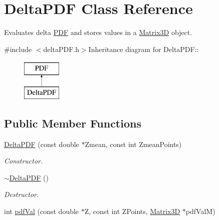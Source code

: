 \hypertarget{classDeltaPDF}{
\section{DeltaPDF Class Reference}
\label{dd/d98/classDeltaPDF}
}


Evaluates delta \hyperlink{classPDF}{PDF} and stores values in a \hyperlink{classMatrix3D}{Matrix3D} object.  


{\ttfamily \#include $<$deltaPDF.h$>$}Inheritance diagram for DeltaPDF::\begin{figure}[H]
\begin{center}
\leavevmode
\includegraphics[height=2cm]{dd/d98/classDeltaPDF}
\end{center}
\end{figure}
\subsection*{Public Member Functions}
\begin{DoxyCompactItemize}
\item 
\hypertarget{classDeltaPDF_a6268a222dac459788d7a7589e0bec1c5}{
\hyperlink{classDeltaPDF_a6268a222dac459788d7a7589e0bec1c5}{DeltaPDF} (const double $\ast$Zmean, const int ZmeanPoints)}
\label{dd/d98/classDeltaPDF_a6268a222dac459788d7a7589e0bec1c5}

\begin{DoxyCompactList}\small\item\em Constructor. \item\end{DoxyCompactList}\item 
\hypertarget{classDeltaPDF_a9539ed9f2f24966af76b6bba4734b2be}{
\hyperlink{classDeltaPDF_a9539ed9f2f24966af76b6bba4734b2be}{$\sim$DeltaPDF} ()}
\label{dd/d98/classDeltaPDF_a9539ed9f2f24966af76b6bba4734b2be}

\begin{DoxyCompactList}\small\item\em Destructor. \item\end{DoxyCompactList}\item 
int \hyperlink{classDeltaPDF_a787e205c3bd8d4f95f7c528497e3a617}{pdfVal} (const double $\ast$Z, const int ZPoints, \hyperlink{classMatrix3D}{Matrix3D} $\ast$pdfValM)
\end{DoxyCompactItemize}


